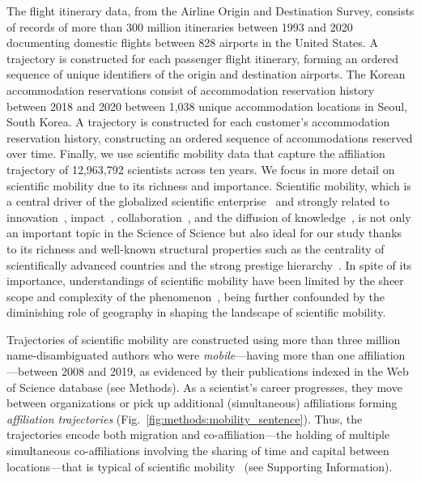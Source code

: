 \documentclass[12pt]{article} %
\def\SI{Supporting Information}
\begin{document}
The flight itinerary data, from the Airline Origin and Destination Survey, consists of records of more than 300 million itineraries between 1993 and 2020 documenting domestic flights between 828 airports in the United States. 
A trajectory is constructed for each passenger flight itinerary, forming an ordered sequence of unique identifiers of the origin and destination airports. 
The Korean accommodation reservations consist of accommodation reservation history between 2018 and 2020 between 1,038 unique accommodation locations in Seoul, South Korea.
A trajectory is constructed for each customer's accommodation reservation history, constructing an ordered sequence of accommodations reserved over time.
Finally, we use scientific mobility data that capture the affiliation trajectory of 12,963,792 scientists across ten years.
We focus in more detail on scientific mobility due to its richness and importance. 
Scientific mobility, which is a central driver of the globalized scientific enterprise~\autocite{czaika2018globalisation, box2008competition} and strongly related to innovation~\autocite{braunerhjelm2020labor, kaiser2018innovation}, impact~\autocite{sugimoto2017mostimpact, petersen2018multiscale}, collaboration~\autocite{rodrigues2016mobility}, and the diffusion of knowledge~\autocite{braunerhjelm2020labor, morgan2018prestige}, is not only an important topic in the Science of Science but also ideal for our study thanks to its richness and well-known structural properties such as the centrality of scientifically advanced countries and the strong prestige hierarchy~\autocite{clauset2015hierarchy, deville2014career}. 
In spite of its importance, understandings of scientific mobility have been limited by the sheer scope and complexity of the phenomenon~\autocite{robinson2019mobility, deville2014career}, being further confounded by the diminishing role of geography in shaping the landscape of scientific mobility.

Trajectories of scientific mobility are constructed using more than three million name-disambiguated authors who were \textit{mobile}---having more than one affiliation---between 2008 and 2019, as evidenced by their publications indexed in the Web of Science database (see Methods).
As a scientist's career progresses, they move between organizations or pick up additional (simultaneous) affiliations forming \textit{affiliation trajectories} (Fig.~\ref{fig:methods:mobility_sentence}).
Thus, the trajectories encode both migration and co-affiliation---the holding of multiple simultaneous co-affiliations involving the sharing of time and capital between locations---that is typical of scientific mobility~\autocite{rodrigues2016mobility, sugimoto2017mostimpact} (see \SI).
\end{document}
